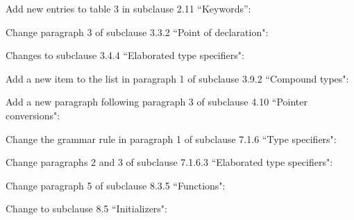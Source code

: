 \begin{cpp}

Add new entries to table 3 in subclause 2.11 ``Keywords'':

Change paragraph 3 of subclause 3.3.2 ``Point of declaration":

Changes to subclause 3.4.4 ``Elaborated type specifiers":

Add a new item to the list in paragraph 1
of subclause 3.9.2 ``Compound types":

Add a new paragraph following paragraph 3
of subclause 4.10 ``Pointer conversions":

Change the grammar rule in paragraph 1 of subclause 7.1.6 ``Type specifiers":

Change paragraphs 2 and 3 of subclause 7.1.6.3 ``Elaborated type specifiers":

Change paragraph 5 of subclause 8.3.5 ``Functions":

Change to subclause 8.5 ``Initializers":

\end{cpp}
